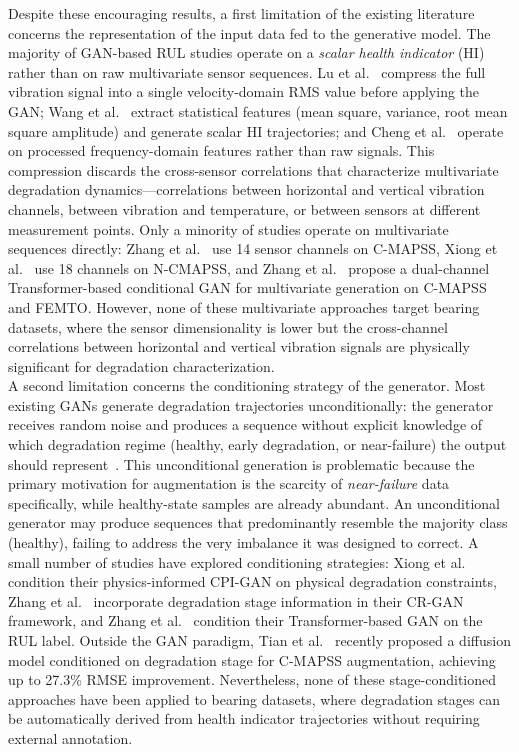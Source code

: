 \documentclass[review]{elsarticle}
\begin{document}
Despite these encouraging results, a first limitation of the existing
literature concerns the representation of the input data fed to the
generative model. The majority of GAN-based RUL studies operate on a
\textit{scalar health indicator} (HI) rather than on raw multivariate
sensor sequences. Lu et al.~\cite{9486650, lu_joint_2022} compress
the full vibration signal into a single velocity-domain RMS value
before applying the GAN; Wang et al.~\cite{vibration7020029} extract
statistical features (mean square, variance, root mean square
amplitude) and generate scalar HI trajectories; and
Cheng et al.~\cite{cheng_remaining_2023} operate on processed
frequency-domain features rather than raw signals. This compression
discards the cross-sensor correlations that characterize multivariate
degradation dynamics---correlations between horizontal and vertical
vibration channels, between vibration and temperature, or between
sensors at different measurement points. Only a minority of studies
operate on multivariate sequences directly: Zhang et al.~\cite{9300234}
use 14 sensor channels on C-MAPSS, Xiong et al.~\cite{xiong_controlled_2023}
use 18 channels on N-CMAPSS, and
Zhang et al.~\cite{zhang_multivariate_2025} propose a dual-channel
Transformer-based conditional GAN for multivariate generation on
C-MAPSS and FEMTO. However, none of these multivariate approaches
target bearing datasets, where the sensor dimensionality is lower but
the cross-channel correlations between horizontal and vertical
vibration signals are physically significant for degradation
characterization.\\

A second limitation concerns the conditioning strategy of the
generator. Most existing GANs generate degradation trajectories
unconditionally: the generator receives random noise and produces a
sequence without explicit knowledge of which degradation regime
(healthy, early degradation, or near-failure) the output should
represent~\cite{9486650, lu_joint_2022, vibration7020029,
wen_gru-ae-wiener_2024}. This unconditional generation is
problematic because the primary motivation for augmentation is the
scarcity of \textit{near-failure} data specifically, while healthy-state
samples are already abundant. An unconditional generator may produce
sequences that predominantly resemble the majority class (healthy),
failing to address the very imbalance it was designed to correct.
A small number of studies have explored conditioning strategies:
Xiong et al.~\cite{xiong_controlled_2023} condition their
physics-informed CPI-GAN on physical degradation constraints,
Zhang et al.~\cite{9300234} incorporate degradation stage information
in their CR-GAN framework, and
Zhang et al.~\cite{zhang_multivariate_2025} condition their
Transformer-based GAN on the RUL label. Outside the GAN paradigm,
Tian et al.~\cite{11503642} recently proposed a diffusion model
conditioned on degradation stage for C-MAPSS augmentation, achieving
up to 27.3\% RMSE improvement. Nevertheless, none of these
stage-conditioned approaches have been applied to bearing datasets,
where degradation stages can be automatically derived from health
indicator trajectories without requiring external annotation.\\
\end{document}
